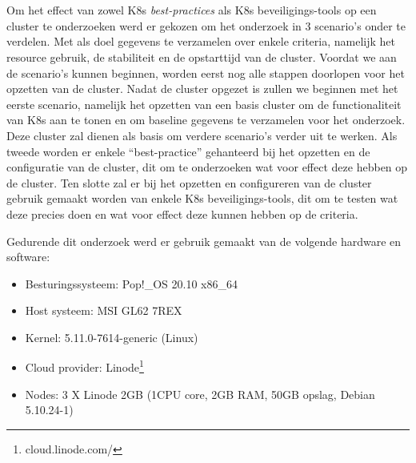 
\chapter{}
\label{ch:methodologie}

Om het effect van zowel K8s \textit{best-practices} als K8s beveiligings-tools op een cluster te onderzoeken werd er gekozen om het onderzoek in 3 scenario's onder te verdelen. Met als doel gegevens te verzamelen over enkele criteria, namelijk het resource gebruik, de stabiliteit en de opstarttijd van de cluster. Voordat we aan de scenario's kunnen beginnen, worden eerst nog alle stappen doorlopen voor het opzetten van de cluster. Nadat de cluster opgezet is zullen we beginnen met het eerste scenario, namelijk het opzetten van een basis cluster om de functionaliteit van K8s aan te tonen en om baseline gegevens te verzamelen voor het onderzoek. Deze cluster zal dienen als basis om verdere scenario's verder uit te werken. Als tweede worden er enkele ``best-practice'' gehanteerd bij het opzetten en de configuratie van de cluster, dit om te onderzoeken wat voor effect deze hebben op de cluster. Ten slotte zal er bij het opzetten en configureren van de cluster gebruik gemaakt worden van enkele K8s beveiligings-tools, dit om te testen wat deze precies doen en wat voor effect deze kunnen hebben op de criteria. 

Gedurende dit onderzoek werd er gebruik gemaakt van de volgende hardware en software:

\begin{itemize}
	\item Besturingssysteem: Pop!\_OS 20.10 x86\_64
	\item Host systeem: MSI GL62 7REX
	\item Kernel: 5.11.0-7614-generic (Linux)
	\item Cloud provider: Linode\footnote{cloud.linode.com/}
	\item Nodes: 3 X Linode 2GB (1CPU core, 2GB RAM, 50GB opslag, Debian 5.10.24-1)
\end{itemize}

